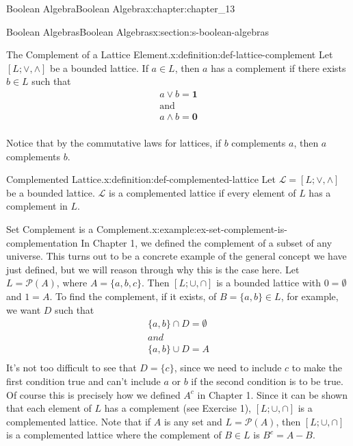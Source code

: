 \documentclass[twoside,10pt,]{book}
\numberwithin{equation}{section}
\begin{document}
\begin{chapterptx}{Boolean Algebra}{}{Boolean Algebra}{}{}{x:chapter:chapter_13}
\begin{sectionptx}{Boolean Algebras}{}{Boolean Algebras}{}{}{x:section:s-boolean-algebras}
\begin{definition}{The Complement of a Lattice Element.}{x:definition:def-lattice-complement}
%
Let \([L; \lor ,\land ]\) be a bounded lattice.  If \(a \in L\), then \(a\) has a complement if there exists \(b \in L\) such that%
\begin{equation*}
\begin{array}{c}
a \lor b = \pmb{1}\\
\textrm{and}\\
a \land b =\pmb{0}\\
\end{array}
\end{equation*}
%
\end{definition}
Notice that by the commutative laws for lattices, if \(b\) complements \(a\), then \(a\) complements \(b\).%
\begin{definition}{Complemented Lattice.}{x:definition:def-complemented-lattice}%
%
Let \(\mathcal{L}=[L; \lor ,\land ]\) be a bounded lattice.   \(\mathcal{L}\) is a complemented lattice if every element of \(L\) has a complement in \(L\).%
\end{definition}
\begin{example}{Set Complement is a Complement.}{x:example:ex-set-complement-is-complementation}%
In Chapter 1, we defined the complement of a subset of any universe.   This turns out to be a concrete example of the general concept we have just defined, but we will reason through why this is the case here.  Let \(L = \mathcal{P}(A)\), where \(A = \{a, b, c\}\). Then \([L; \cup  , \cap ]\) is a bounded lattice with \(0 = \emptyset\) and \(1 = A\). To find the complement, if it exists, of \(B = \{a, b\} \in  L\), for example, we want \(D\) such that%
\begin{equation*}
\begin{array}{c}
\{a,b\} \cap D = \emptyset\\ 
and\\
\{a,b\} \cup  D = A\\
\end{array}
\end{equation*}
It's not too difficult to see that  \(D = \{c\}\), since we need to include \(c\) to make the first condition true and can't include \(a\) or \(b\) if the second condition is to be true.  Of course this is precisely how we defined \(A^c\) in Chapter 1.  Since it can be shown that each element of \(L\) has a complement (see Exercise 1), \([L; \cup  , \cap ]\) is a complemented lattice. Note that if \(A\) is any set and \(L = \mathcal{P}(A)\), then \([L; \cup  , \cap ]\) is a complemented lattice where the complement of \(B \in  L\) is \(B ^c = A - B\).%

\end{example}
\end{sectionptx}
\end{chapterptx}
\end{document}
